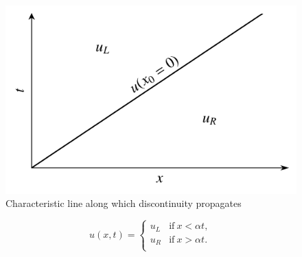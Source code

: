 \begin{figure}[htbp]
	\centering
	\includegraphics[width=0.5\linewidth]{Pictures/riem_lsc_characteristics}
	\caption{Characteristic line along which discontinuity propagates}
	\label{fig:riem_charact_scalar}
\end{figure}
\begin{eqBox}
\begin{equation}
	u(x,t) = 
	\begin{cases}
		u_L & \text{if}~x<\alpha t,\\
		u_R & \text{if}~x>\alpha t.\\
	\end{cases}
\end{equation}
\end{eqBox}
